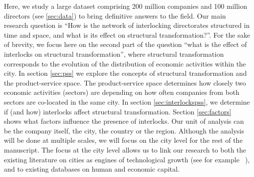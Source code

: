 Here, we study a large dataset comprising 200 million companies and 100 million directors (see \ref{sec:data}) to bring definitive answers to the field.
Our main research question is ``How is the network of interlocking directorates structured in time and space, and what is its effect on structural transformation?''.
For the sake of brevity, we focus here on the second part of the question ``what is the effect of interlocks on structural transformation'',
where structural transformation corresponds to the evolution of the distribution of economic activities within the city.
In section \ref{sec:pss} we explore the concepts of structural transformation and the product-service space.
The product-service space determines how closely two economic activities (sectors) are depending on how often companies from both sectors are co-located in the same city.
In section \ref{sec:interlockspss}, we determine if (and how) interlocks affect structural transformation.
Section \ref{sec:factors} shows what factors influence the presence of interlocks.
Our unit of analysis can be the company itself, the city, the country or the region. 
Although the analysis will be done at multiple scales,
we will focus on the city level for the rest of the manuscript.
The focus at the city level allows us to link our research to both the existing literature on cities as engines of technological growth (see for example ~\citep{Belderbos2014}),
and to existing databases on human and economic capital.


